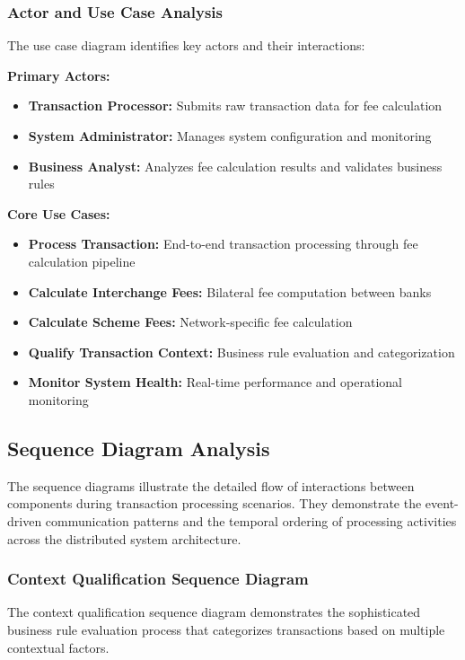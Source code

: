\subsubsection{Actor and Use Case Analysis}

The use case diagram identifies key actors and their interactions:

\textbf{Primary Actors:}
\begin{itemize}
    \item \textbf{Transaction Processor:} Submits raw transaction data for fee calculation
    \item \textbf{System Administrator:} Manages system configuration and monitoring
    \item \textbf{Business Analyst:} Analyzes fee calculation results and validates business rules
\end{itemize}

\textbf{Core Use Cases:}
\begin{itemize}
    \item \textbf{Process Transaction:} End-to-end transaction processing through fee calculation pipeline
    \item \textbf{Calculate Interchange Fees:} Bilateral fee computation between banks
    \item \textbf{Calculate Scheme Fees:} Network-specific fee calculation
    \item \textbf{Qualify Transaction Context:} Business rule evaluation and categorization
    \item \textbf{Monitor System Health:} Real-time performance and operational monitoring
\end{itemize}

\subsection{Sequence Diagram Analysis}

The sequence diagrams illustrate the detailed flow of interactions between components during transaction processing scenarios. They demonstrate the event-driven communication patterns and the temporal ordering of processing activities across the distributed system architecture.

\subsubsection{Context Qualification Sequence Diagram}

The context qualification sequence diagram demonstrates the sophisticated business rule evaluation process that categorizes transactions based on multiple contextual factors.

